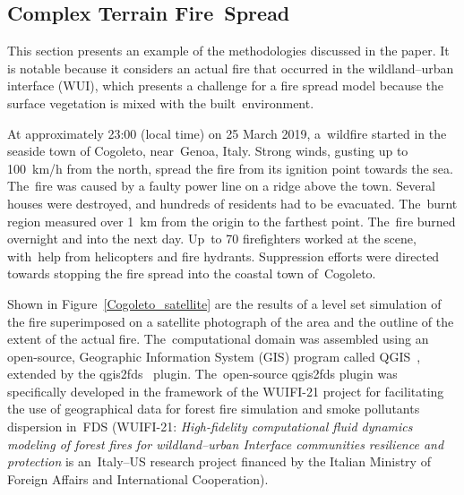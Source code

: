 \documentclass[atmosphere,article,accept,moreauthors,pdftex]{Definitions/mdpi}
\begin{document}
\begin{paracol}{2}
\switchcolumn



\subsection{Complex Terrain Fire~Spread}  
\label{sec:cogo}

This section presents an example of the methodologies discussed in the paper. It is notable because it considers an actual fire that occurred in the wildland–urban interface (WUI), which presents a challenge for a fire spread model because the surface vegetation is mixed with the built~environment.

At approximately 23:00 (local time) on  25 March 2019, a~wildfire started in the seaside town of Cogoleto, near~Genoa, Italy. Strong winds, gusting up to 100~km/h from the north, spread the fire from its ignition point towards the sea. The~fire was caused by a faulty power line on a ridge above the town. Several houses were destroyed, and hundreds of residents had to be evacuated. The~burnt region measured over 1~km from the origin to the farthest point. The~fire burned overnight and into the next day. Up~to 70 firefighters worked at the scene, with~help from helicopters and fire hydrants. Suppression efforts were directed towards stopping the fire spread into the coastal town of~Cogoleto.

Shown in Figure~\ref{Cogoleto_satellite} are the results of a level set simulation of the fire superimposed on a satellite photograph of the area and the outline of the extent of the actual fire. The~computational domain was assembled using an open-source, Geographic Information System (GIS) program called QGIS~\cite{QGIS}, extended by the qgis2fds~\cite{qgis2fds} plugin. The~open-source qgis2fds plugin was specifically developed in the framework of the WUIFI-21 project for facilitating the use of geographical data for forest fire simulation and smoke pollutants dispersion in~FDS (WUIFI-21: {\it High-fidelity computational fluid dynamics modeling of forest fires for wildland–urban Interface communities resilience and protection} is an~Italy–US research project financed by the Italian Ministry of Foreign Affairs and International Cooperation).


\end{paracol}
\end{document}
